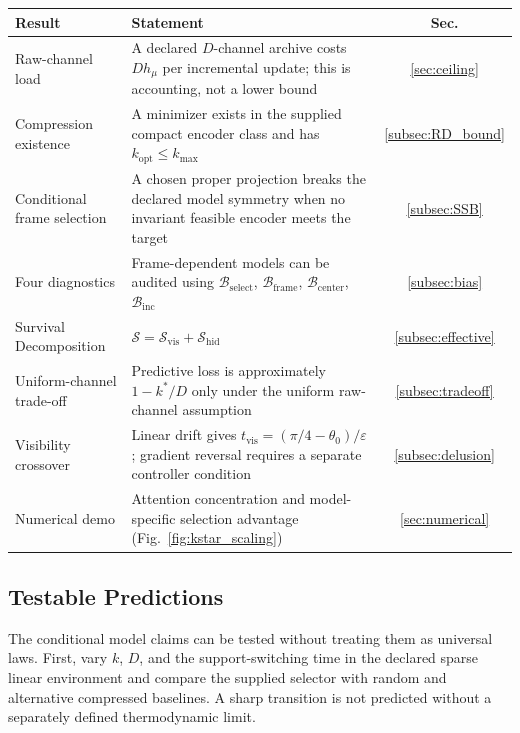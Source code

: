 \documentclass[12pt]{article}
\begin{document}
\begin{center}
\small
\setlength{\tabcolsep}{4pt}%
\begin{tabular}{@{}lP{6cm}c@{}}
\toprule
\textbf{Result} & \textbf{Statement} & \textbf{Sec.} \\
\midrule
Raw-channel load
  & A declared $D$-channel archive costs $D h_\mu$ per
    incremental update; this is accounting, not a lower bound
  & \ref{sec:ceiling} \\[3pt]
Compression existence
  & A minimizer exists in the supplied compact encoder class and has
    $k_{\mathrm{opt}}\leq k_{\max}$
  & \ref{subsec:RD_bound} \\[3pt]
Conditional frame selection
  & A chosen proper projection breaks the declared model symmetry when
    no invariant feasible encoder meets the target
  & \ref{subsec:SSB} \\[3pt]
Four diagnostics
  & Frame-dependent models can be audited using $\mathcal{B}_{\mathrm{select}}$,
    $\mathcal{B}_{\mathrm{frame}}$,
    $\mathcal{B}_{\mathrm{center}}$,
    $\mathcal{B}_{\mathrm{inc}}$
  & \ref{subsec:bias} \\[3pt]
Survival Decomposition
  & $\mathcal{S} = \mathcal{S}_{\mathrm{vis}} +
    \mathcal{S}_{\mathrm{hid}}$
  & \ref{subsec:effective} \\[3pt]
Uniform-channel trade-off
  & Predictive loss is approximately $1-k^*/D$ only under the
    uniform raw-channel assumption
  & \ref{subsec:tradeoff} \\[3pt]
Visibility crossover
  & Linear drift gives $t_{\mathrm{vis}}=(\pi/4-\theta_0)/\varepsilon$;
    gradient reversal requires a separate controller condition
  & \ref{subsec:delusion} \\[3pt]
Numerical demo
  & Attention concentration and model-specific selection advantage
    (Fig.~\ref{fig:kstar_scaling})
  & \ref{sec:numerical} \\
\bottomrule
\end{tabular}
\end{center}

\subsection{Testable Predictions}
\label{subsec:predictions}

The conditional model claims can be tested without treating them as
universal laws.  First, vary $k$, $D$, and the support-switching time in
the declared sparse linear environment and compare the supplied selector
with random and alternative compressed baselines.  A sharp transition is
not predicted without a separately defined thermodynamic limit.
\end{document}
